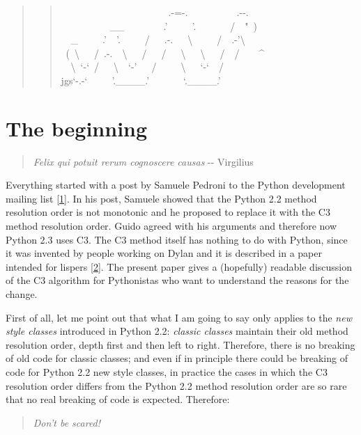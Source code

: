 \documentclass[10pt,a4paper,english]{article}
\begin{document}
\hspace*{\fill}\hrulefill\hspace*{\fill}

\begin{quote}
\begin{quote}{\ttfamily \raggedright \noindent
~~~~~~~~~~~~~~~~~~~~~~.-=-.~~~~~~~~~~.-{}-.~\\
~~~~~~~~~~{\_}{\_}~~~~~~~~.'~~~~~'.~~~~~~~/~~"~)~\\
~~{\_}~~~~~.'~~'.~~~~~/~~~.-.~~~{\textbackslash}~~~~~/~~.-'{\textbackslash}~\\
~(~{\textbackslash}~~~/~.-.~~{\textbackslash}~~~/~~~/~~~{\textbackslash}~~~{\textbackslash}~~~/~~/~~~~{\textasciicircum}~\\
~~{\textbackslash}~`-`~/~~~{\textbackslash}~~`-'~~~/~~~~~{\textbackslash}~~~`-`~~/~\\
jgs`-.-`~~~~~'.{\_}{\_}{\_}{\_}.'~~~~~~~`.{\_}{\_}{\_}{\_}.'
}\end{quote}
\end{quote}



\hypertarget{the-beginning}{}
\section*{The beginning}
\begin{quote}

\emph{Felix qui potuit rerum cognoscere causas} -{}- Virgilius
\end{quote}

Everything started with a post by Samuele Pedroni to the Python
development mailing list [\hyperlink{id4}{1}].  In his post, Samuele showed that the
Python 2.2 method resolution order is not monotonic and he proposed to
replace it with the C3 method resolution order.  Guido agreed with his
arguments and therefore now Python 2.3 uses C3.  The C3 method itself
has nothing to do with Python, since it was invented by people working
on Dylan and it is described in a paper intended for lispers [\hyperlink{id5}{2}].  The
present paper gives a (hopefully) readable discussion of the C3
algorithm for Pythonistas who want to understand the reasons for the
change.

First of all, let me point out that what I am going to say only applies
to the \emph{new style classes} introduced in Python 2.2:  \emph{classic classes}
maintain their old method resolution order, depth first and then left to
right.  Therefore, there is no breaking of old code for classic classes;
and even if in principle there could be breaking of code for Python 2.2
new style classes, in practice the cases in which the C3 resolution
order differs from the Python 2.2 method resolution order are so rare
that no real breaking of code is expected.  Therefore:
\begin{quote}

\emph{Don't be scared!}
\end{quote}
\end{document}
